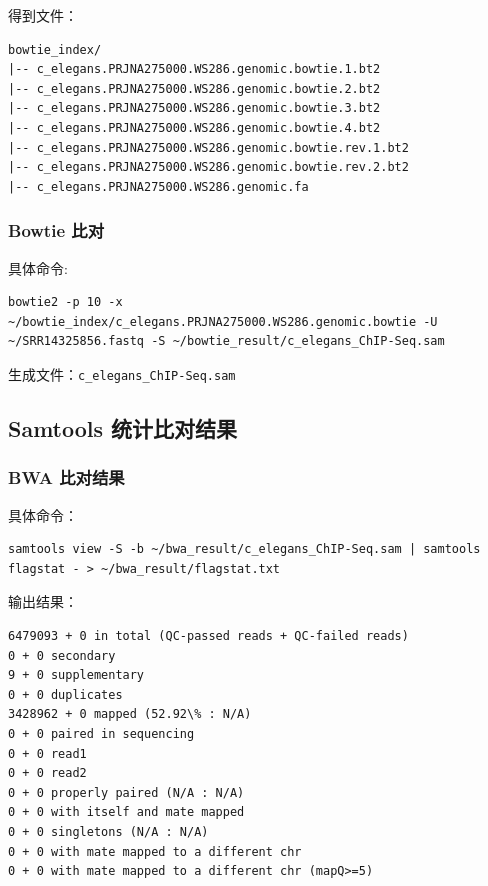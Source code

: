 \documentclass[UTF8]{ctexart}
\begin{document}
得到文件：

\begin{lstlisting}
bowtie_index/
|-- c_elegans.PRJNA275000.WS286.genomic.bowtie.1.bt2
|-- c_elegans.PRJNA275000.WS286.genomic.bowtie.2.bt2
|-- c_elegans.PRJNA275000.WS286.genomic.bowtie.3.bt2
|-- c_elegans.PRJNA275000.WS286.genomic.bowtie.4.bt2
|-- c_elegans.PRJNA275000.WS286.genomic.bowtie.rev.1.bt2
|-- c_elegans.PRJNA275000.WS286.genomic.bowtie.rev.2.bt2
|-- c_elegans.PRJNA275000.WS286.genomic.fa
\end{lstlisting}

\subsubsection{Bowtie 比对}

具体命令:

\begin{lstlisting}
bowtie2 -p 10 -x ~/bowtie_index/c_elegans.PRJNA275000.WS286.genomic.bowtie -U ~/SRR14325856.fastq -S ~/bowtie_result/c_elegans_ChIP-Seq.sam
\end{lstlisting}

生成文件：\verb|c_elegans_ChIP-Seq.sam|

\subsection{Samtools 统计比对结果}

\subsubsection{BWA 比对结果}

具体命令：

\begin{lstlisting}
samtools view -S -b ~/bwa_result/c_elegans_ChIP-Seq.sam | samtools flagstat - > ~/bwa_result/flagstat.txt
\end{lstlisting}

输出结果：

\begin{lstlisting}
6479093 + 0 in total (QC-passed reads + QC-failed reads)
0 + 0 secondary
9 + 0 supplementary
0 + 0 duplicates
3428962 + 0 mapped (52.92\% : N/A)
0 + 0 paired in sequencing
0 + 0 read1
0 + 0 read2
0 + 0 properly paired (N/A : N/A)
0 + 0 with itself and mate mapped
0 + 0 singletons (N/A : N/A)
0 + 0 with mate mapped to a different chr
0 + 0 with mate mapped to a different chr (mapQ>=5)
\end{lstlisting}
\end{document}
